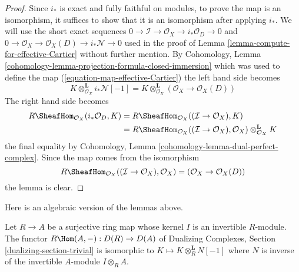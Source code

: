 \begin{proof}
Since $i_*$ is exact and fully faithful on modules, to prove the map is an
isomorphism, it suffices to show that it is an isomorphism after applying
$i_*$. We will use the short exact sequences
$0 \to \mathcal{I} \to \mathcal{O}_X \to i_*\mathcal{O}_D \to 0$
and
$0 \to \mathcal{O}_X \to \mathcal{O}_X(D) \to i_*\mathcal{N} \to 0$
used in the proof of Lemma \ref{lemma-compute-for-effective-Cartier}
without further mention. By
Cohomology, Lemma \ref{cohomology-lemma-projection-formula-closed-immersion}
which was used to define the map (\ref{equation-map-effective-Cartier})
the left hand side becomes
$$
K \otimes_{\mathcal{O}_X}^\mathbf{L} i_*\mathcal{N}[-1] =
K \otimes_{\mathcal{O}_X}^\mathbf{L} (\mathcal{O}_X \to \mathcal{O}_X(D))
$$
The right hand side becomes
\begin{align*}
R\SheafHom_{\mathcal{O}_X}(i_*\mathcal{O}_D, K) & =
R\SheafHom_{\mathcal{O}_X}((\mathcal{I} \to \mathcal{O}_X), K) \\
& =
R\SheafHom_{\mathcal{O}_X}((\mathcal{I} \to \mathcal{O}_X), \mathcal{O}_X)
\otimes_{\mathcal{O}_X}^\mathbf{L} K
\end{align*}
the final equality by
Cohomology, Lemma \ref{cohomology-lemma-dual-perfect-complex}.
Since the map comes from the isomorphism
$$
R\SheafHom_{\mathcal{O}_X}((\mathcal{I} \to \mathcal{O}_X), \mathcal{O}_X)
= (\mathcal{O}_X \to \mathcal{O}_X(D))
$$
the lemma is clear.
\end{proof}

\noindent
Here is an algebraic version of the lemmas above.

\begin{lemma}
\label{lemma-compute-for-effective-Cartier-algebraic}
Let $R \to A$ be a surjective ring map whose kernel $I$
is an invertible $R$-module. The functor
$R\Hom(A, -) : D(R) \to D(A)$ of
Dualizing Complexes, Section \ref{dualizing-section-trivial}
is isomorphic to $K \mapsto K \otimes_R^\mathbf{L} N[-1]$
where $N$ is inverse of the invertible $A$-module $I \otimes_R A$.
\end{lemma}

